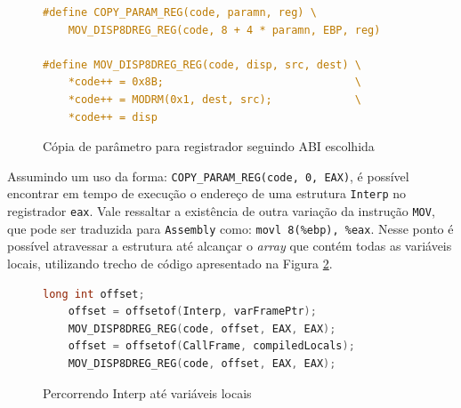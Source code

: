 \begin{figure}[ht!]
  \centering
  \begin{lstlisting}[language=C]
#define COPY_PARAM_REG(code, paramn, reg) \
    MOV_DISP8DREG_REG(code, 8 + 4 * paramn, EBP, reg)

#define MOV_DISP8DREG_REG(code, disp, src, dest) \
    *code++ = 0x8B;                              \
    *code++ = MODRM(0x1, dest, src);             \
    *code++ = disp
  \end{lstlisting}
  \caption{Cópia de parâmetro para registrador seguindo ABI escolhida\label{copy-param}}
\end{figure}

Assumindo um uso da forma:
\verb!COPY_PARAM_REG(code, 0, EAX)!, é possível encontrar em tempo de execução o
endereço de uma estrutura \verb!Interp! no registrador
\verb!eax!. Vale ressaltar a existência de outra variação
da instrução
\verb!MOV!, que pode ser traduzida para \texttt{Assembly} como:
\verb!movl 8(%ebp), %eax!. Nesse ponto é possível atravessar a estrutura até
alcançar o \textit{array} que contém todas as variáveis locais, utilizando
trecho de código apresentado na Figura \ref{goto-varstruct}.

\begin{figure}[ht!]
  \centering
  \begin{lstlisting}[language=C]
    long int offset;
    offset = offsetof(Interp, varFramePtr);
    MOV_DISP8DREG_REG(code, offset, EAX, EAX);
    offset = offsetof(CallFrame, compiledLocals);
    MOV_DISP8DREG_REG(code, offset, EAX, EAX);
  \end{lstlisting}
  \caption{Percorrendo Interp até variáveis locais\label{goto-varstruct}}
\end{figure}

